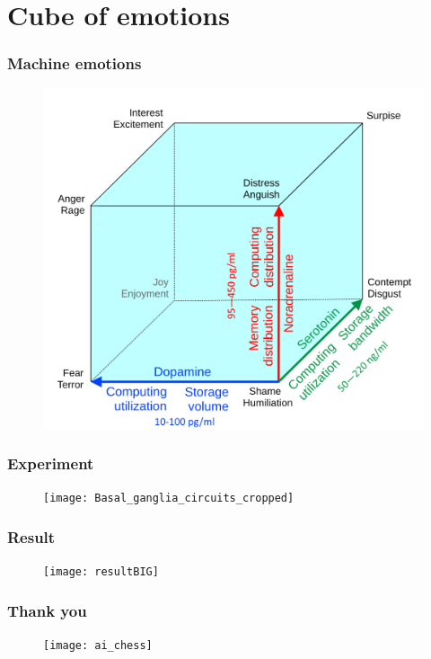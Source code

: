 \documentclass[12pt, aspectratio=169]{beamer}
\begin{document}
\section{Cube of emotions}


\begin{frame}
\frametitle{Machine emotions}
\begin{figure}
\includegraphics[width=0.6\linewidth]{advanced_cube_weight}
\end{figure}
\end{frame}



\begin{frame}
\frametitle{Experiment}
\begin{figure}
\texttt{[image: Basal\_ganglia\_circuits\_cropped]}
\end{figure}
\end{frame}



\begin{frame}
\frametitle{Result}
\begin{figure}
\texttt{[image: resultBIG]}
\end{figure}
\end{frame}


\begin{frame}
\frametitle{Thank you}
\begin{figure}
\texttt{[image: ai\_chess]}
\end{figure}
\end{frame}

\end{document}
